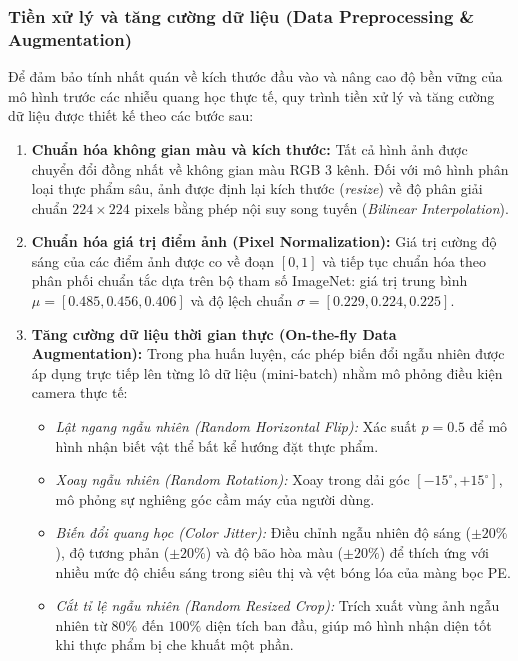 \subsubsection{Tiền xử lý và tăng cường dữ liệu (Data Preprocessing \& Augmentation)}
Để đảm bảo tính nhất quán về kích thước đầu vào và nâng cao độ bền vững của mô hình trước các nhiễu quang học thực tế, quy trình tiền xử lý và tăng cường dữ liệu được thiết kế theo các bước sau:
\begin{enumerate}[leftmargin=0.8cm, itemsep=2pt, topsep=2pt]
    \item \textbf{Chuẩn hóa không gian màu và kích thước:} Tất cả hình ảnh được chuyển đổi đồng nhất về không gian màu RGB 3 kênh. Đối với mô hình phân loại thực phẩm sâu, ảnh được định lại kích thước (\textit{resize}) về độ phân giải chuẩn $224 \times 224$ pixels bằng phép nội suy song tuyến (\textit{Bilinear Interpolation}).
    \item \textbf{Chuẩn hóa giá trị điểm ảnh (Pixel Normalization):} Giá trị cường độ sáng của các điểm ảnh được co về đoạn $[0, 1]$ và tiếp tục chuẩn hóa theo phân phối chuẩn tắc dựa trên bộ tham số ImageNet: giá trị trung bình $\mu = [0.485, 0.456, 0.406]$ và độ lệch chuẩn $\sigma = [0.229, 0.224, 0.225]$.
    \item \textbf{Tăng cường dữ liệu thời gian thực (On-the-fly Data Augmentation):} Trong pha huấn luyện, các phép biến đổi ngẫu nhiên được áp dụng trực tiếp lên từng lô dữ liệu (mini-batch) nhằm mô phỏng điều kiện camera thực tế:
    \begin{itemize}[leftmargin=0.6cm, label=--, itemsep=1pt]
        \item \textit{Lật ngang ngẫu nhiên (Random Horizontal Flip):} Xác suất $p = 0.5$ để mô hình nhận biết vật thể bất kể hướng đặt thực phẩm.
        \item \textit{Xoay ngẫu nhiên (Random Rotation):} Xoay trong dải góc $[-15^\circ, +15^\circ]$, mô phỏng sự nghiêng góc cầm máy của người dùng.
        \item \textit{Biến đổi quang học (Color Jitter):} Điều chỉnh ngẫu nhiên độ sáng ($\pm 20\%$), độ tương phản ($\pm 20\%$) và độ bão hòa màu ($\pm 20\%$) để thích ứng với nhiều mức độ chiếu sáng trong siêu thị và vệt bóng lóa của màng bọc PE.
        \item \textit{Cắt tỉ lệ ngẫu nhiên (Random Resized Crop):} Trích xuất vùng ảnh ngẫu nhiên từ $80\%$ đến $100\%$ diện tích ban đầu, giúp mô hình nhận diện tốt khi thực phẩm bị che khuất một phần.
    \end{itemize}
\end{enumerate}

